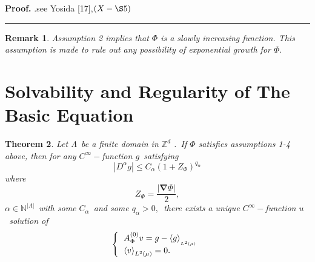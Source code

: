 \documentclass{article}
\newtheorem{theorem}{Theorem}
\newtheorem{remark}[theorem]{Remark}
\newenvironment{proof}[1][Proof]{\noindent\textbf{#1.} }{\ \rule{0.5em}{0.5em}}
\begin{document}
\begin{proof}
$.$see Yosida [17],$\left( X-\S 5\right) $
\end{proof}

\begin{remark}
Assumption 2 implies that $\Phi $ is a slowly increasing function. This
assumption is made to rule out any possibility of exponential growth for $%
\Phi .$
\end{remark}

\section{Solvability and Regularity of The Basic Equation}

\begin{theorem}
\textit{Let }$\Lambda $\textit{\ be a finite domain in }$\mathbb{Z}^{d}$%
\textit{.\ If }$\Phi $ \textit{satisfies assumptions 1-4 above,} \textit{%
then for any }$C^{\infty }-$\textit{function }$g$\textit{\ satisfying }%
\begin{equation}
\left| D^{\alpha }g\right| \leq C_{\alpha }(1+Z_{\Phi })^{q_{\alpha }}
\end{equation}%
\textit{where}%
\begin{equation*}
Z_{\Phi }=\frac{\left| \mathbf{\nabla }\Phi \right| }{2},
\end{equation*}%
$\alpha \in \mathbb{N}^{\left| \Lambda \right| }$\textit{\ with some }$%
C_{\alpha }$\textit{\ and some }$q_{\alpha }>0,$\textit{\ there exists a
unique }$C^{\infty }-$\textit{function }$u$\textit{\ solution of \ }%
\begin{equation}
\left\{ 
\begin{tabular}{l}
$A_{\Phi }^{(0)}v=g-\left\langle g\right\rangle _{_{L^{2}(\mu )}}$ \\ 
$\left\langle v\right\rangle _{L^{2}(\mu )}=0.$%
\end{tabular}%
\right.
\end{equation}
\end{theorem}
\end{document}
